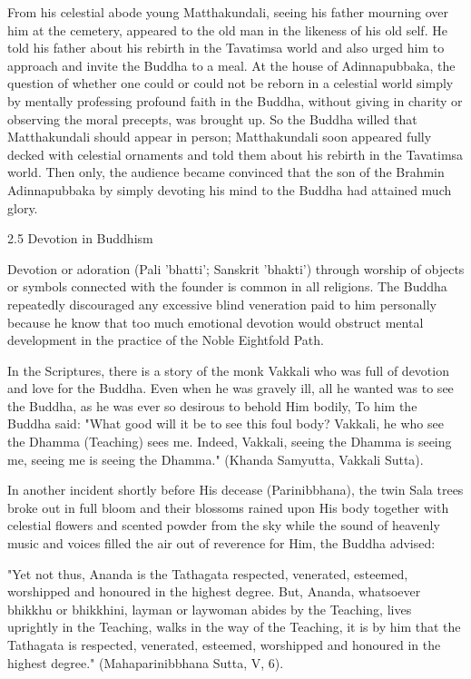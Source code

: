 From his celestial abode young Matthakundali, seeing his father mourning over him at the cemetery, appeared to the old man in the likeness of his old self. He told his father about his rebirth in the Tavatimsa world and also urged him to approach and invite the Buddha to a meal. At the house of Adinnapubbaka, the question of whether one could or could not be reborn in a celestial world simply by mentally professing profound faith in the Buddha, without giving in charity or observing the moral precepts, was brought up. So the Buddha willed that Matthakundali should appear in person; Matthakundali soon appeared fully decked with celestial ornaments and told them about his rebirth in the Tavatimsa world. Then only, the audience became convinced that the son of the Brahmin Adinnapubbaka by simply devoting his mind to the Buddha had attained much glory.

2.5 Devotion in Buddhism

Devotion or adoration (Pali 'bhatti'; Sanskrit 'bhakti') through worship of objects or symbols connected with the founder is common in all religions. The Buddha repeatedly discouraged any excessive blind veneration paid to him personally because he know that too much emotional devotion would obstruct mental development in the practice of the Noble Eightfold Path.

In the Scriptures, there is a story of the monk Vakkali who was full of devotion and love for the Buddha. Even when he was gravely ill, all he wanted was to see the Buddha, as he was ever so desirous to behold Him bodily, To him the Buddha said: "What good will it be to see this foul body? Vakkali, he who see the Dhamma (Teaching) sees me. Indeed, Vakkali, seeing the Dhamma is seeing me, seeing me is seeing the Dhamma." (Khanda Samyutta, Vakkali Sutta).

In another incident shortly before His decease (Parinibbhana), the twin Sala trees broke out in full bloom and their blossoms rained upon His body together with celestial flowers and scented powder from the sky while the sound of heavenly music and voices filled the air out of reverence for Him, the Buddha advised:

"Yet not thus, Ananda is the Tathagata respected, venerated, esteemed, worshipped and honoured in the highest degree. But, Ananda, whatsoever bhikkhu or bhikkhini, layman or laywoman abides by the Teaching, lives uprightly in the Teaching, walks in the way of the Teaching, it is by him that the Tathagata is respected, venerated, esteemed, worshipped and honoured in the highest degree." (Mahaparinibbhana Sutta, V, 6).


